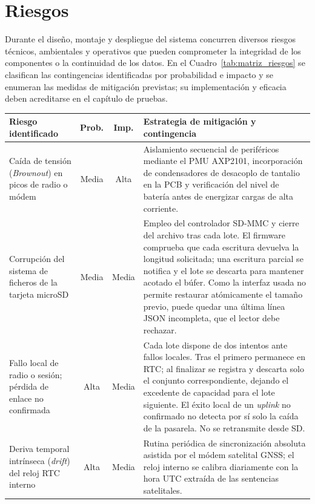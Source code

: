 \section{Riesgos}

Durante el diseño, montaje y despliegue del sistema concurren diversos riesgos técnicos, ambientales y operativos que pueden comprometer la integridad de los componentes o la continuidad de los datos. En el Cuadro~\ref{tab:matriz_riesgos} se clasifican las contingencias identificadas por probabilidad e impacto y se enumeran las medidas de mitigación previstas; su implementación y eficacia deben acreditarse en el capítulo de pruebas.

\begin{table}[htbp]
\centering
\small
\begin{tabular}{p{3.5cm} c c p{6.8cm}}
\hline
\textbf{Riesgo identificado} & \textbf{Prob.} & \textbf{Imp.} & \textbf{Estrategia de mitigación y contingencia} \\ \hline
Caída de tensión (\textit{Brownout}) en picos de radio o módem & Media & Alta & Aislamiento secuencial de periféricos mediante el PMU AXP2101, incorporación de condensadores de desacoplo de tantalio en la PCB y verificación del nivel de batería antes de energizar cargas de alta corriente. \\ \hline
Corrupción del sistema de ficheros de la tarjeta microSD & Media & Media & Empleo del controlador SD-MMC y cierre del archivo tras cada lote. El firmware comprueba que cada escritura devuelva la longitud solicitada; una escritura parcial se notifica y el lote se descarta para mantener acotado el búfer. Como la interfaz usada no permite restaurar atómicamente el tamaño previo, puede quedar una última línea JSON incompleta, que el lector debe rechazar. \\ \hline
Fallo local de radio o sesión; pérdida de enlace no confirmada & Alta & Media & Cada lote dispone de dos intentos ante fallos locales. Tras el primero permanece en RTC; al finalizar se registra y descarta solo el conjunto correspondiente, dejando el excedente de capacidad para el lote siguiente. El éxito local de un \textit{uplink} no confirmado no detecta por sí solo la caída de la pasarela. No se retransmite desde SD. \\ \hline
Deriva temporal intrínseca (\textit{drift}) del reloj RTC interno & Alta & Media & Rutina periódica de sincronización absoluta asistida por el módem satelital GNSS; el reloj interno se calibra diariamente con la hora UTC extraída de las sentencias satelitales. \\ \hline

\end{tabular}
\end{table}

